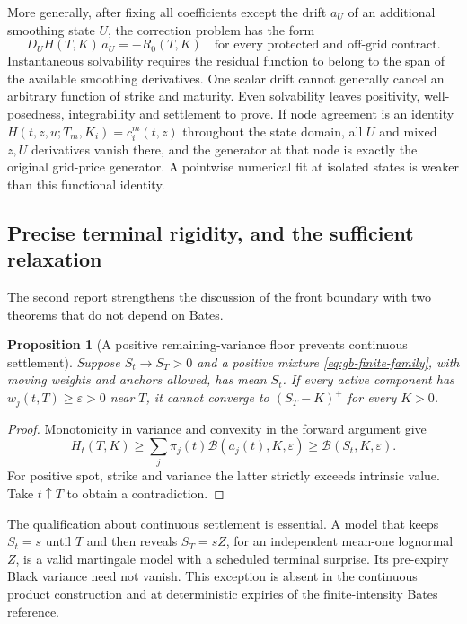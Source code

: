 \documentclass[11pt,a4paper]{article}
\numberwithin{equation}{section}
\newtheorem{proposition}[theorem]{Proposition}
\theoremstyle{definition}\newtheorem{definition}[theorem]{Definition}
\theoremstyle{remark}\newtheorem{remark}[theorem]{Remark}
\newcommand{\Black}{\mathcal B}\newcommand{\LC}{\mathcal L}
\begin{document}
More generally, after fixing all coefficients except the drift $a_U$ of an additional smoothing state $U$, the correction problem has the form
\begin{equation}
 D_UH(T,K)\,a_U=-R_0(T,K)\quad\text{for every protected and off-grid contract}.
 \label{eq:gb-tangent-span}
\end{equation}
Instantaneous solvability requires the residual function to belong to the span of the available smoothing derivatives. One scalar drift cannot generally cancel an arbitrary function of strike and maturity. Even solvability leaves positivity, well-posedness, integrability and settlement to prove. If node agreement is an identity $H(t,z,u;T_m,K_i)=c_i^m(t,z)$ throughout the state domain, all $U$ and mixed $z,U$ derivatives vanish there, and the generator at that node is exactly the original grid-price generator. A pointwise numerical fit at isolated states is weaker than this functional identity.

\subsection{Precise terminal rigidity, and the sufficient relaxation}
\label{sec:bates-rigidity}
The second report strengthens the discussion of the front boundary with two theorems that do not depend on Bates.

\begin{proposition}[A positive remaining-variance floor prevents continuous settlement]
\label{prop:gb-floor}
Suppose $S_t\to S_T>0$ and a positive mixture \eqref{eq:gb-finite-family}, with moving weights and anchors allowed, has mean $S_t$. If every active component has $w_j(t,T)\geq\varepsilon>0$ near $T$, it cannot converge to $(S_T-K)^+$ for every $K>0$.
\end{proposition}
\begin{proof}
Monotonicity in variance and convexity in the forward argument give
\[
 H_t(T,K)\geq\sum_j\pi_j(t)\Black(a_j(t),K,\varepsilon)
          \geq\Black(S_t,K,\varepsilon).
\]
For positive spot, strike and variance the latter strictly exceeds intrinsic value. Take $t\uparrow T$ to obtain a contradiction.
\end{proof}
The qualification about continuous settlement is essential. A model that keeps $S_t=s$ until $T$ and then reveals $S_T=sZ$, for an independent mean-one lognormal $Z$, is a valid martingale model with a scheduled terminal surprise. Its pre-expiry Black variance need not vanish. This exception is absent in the continuous product construction and at deterministic expiries of the finite-intensity Bates reference.
\end{document}
